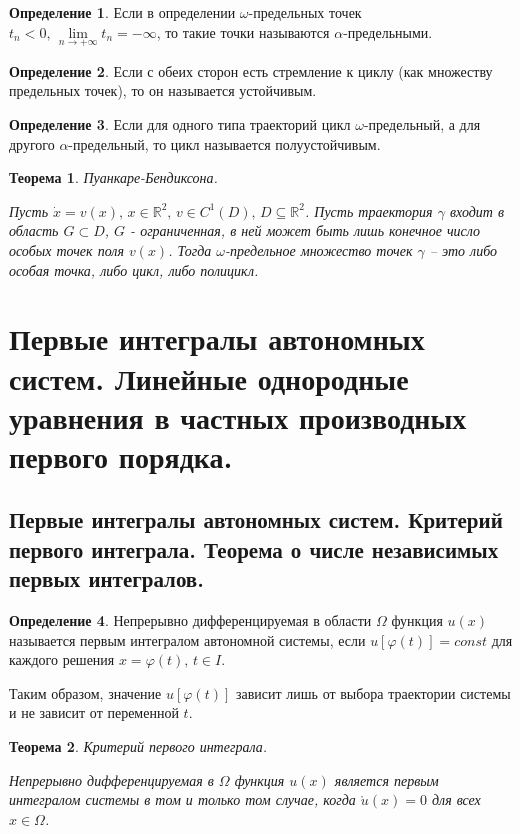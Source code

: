 \documentclass[a4paper,12pt]{article}
\renewcommand{\phi}{\ensuremath{\varphi}}
\theoremstyle{plain}
\newtheorem{theorem}{Теорема}[section]
\theoremstyle{definition}
\newtheorem{definition}{Определение}[section]
\theoremstyle{remark}
\begin{document}
\begin{definition}
	Если в определении $\omega$-предельных точек $t_n < 0,\, \lim\limits_{n \to +\infty} t_n = -\infty$, то такие точки называются $\alpha$-предельными.
\end{definition}

\begin{definition}
	Если с обеих сторон есть стремление к циклу (как множеству предельных точек), то он называется устойчивым.
\end{definition}

\begin{definition}
	Если для одного типа траекторий цикл $\omega$-предельный, а для другого $\alpha$-предельный, то цикл называется полуустойчивым.
\end{definition}

\begin{theorem}
	Пуанкаре-Бендиксона.

	Пусть $\dot{x} = v(x),\, x \in \mathbb{R}^2,\, v \in C^1(D),\, D \subseteq \mathbb{R}^2$. Пусть траектория $\gamma$ входит в область $G \subset D$, $G$ - ограниченная, в ней может быть лишь конечное число особых точек поля $v(x)$. Тогда $\omega$-предельное множество точек $\gamma$ -- это либо особая точка, либо цикл, либо полицикл.
\end{theorem}

\section{Первые интегралы автономных систем. Линейные однородные уравнения в частных производных первого порядка.}
\subsection{Первые интегралы автономных систем. Критерий первого интеграла. Теорема о числе независимых первых интегралов.}
\begin{definition}
	Непрерывно дифференцируемая в области $\Omega$ функция $u(x)$ называется первым интегралом автономной системы, если $u[\phi(t)] = const$ для каждого решения $x = \phi(t),\, t \in I$.

	Таким образом, значение $u[\phi(t)]$ зависит лишь от выбора траектории системы и не зависит от переменной $t$.
\end{definition}

\begin{theorem}
	Критерий первого интеграла.

	Непрерывно дифференцируемая в $\Omega$ функция $u(x)$ является первым интегралом системы в том и только том случае, когда $\mathring{u}(x) = 0$ для всех $x \in \Omega$.
\end{theorem}
\end{document}
